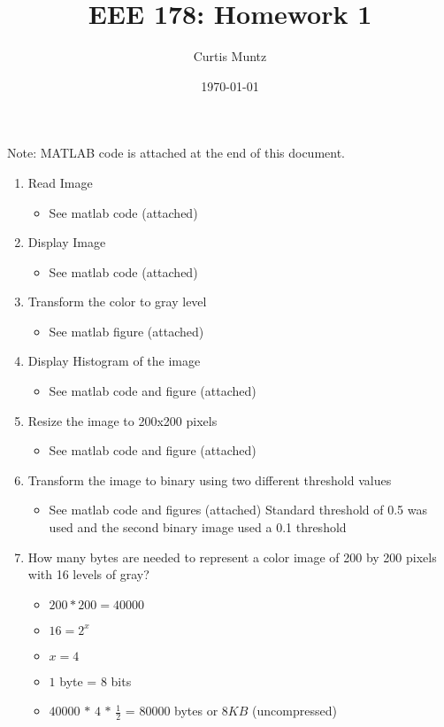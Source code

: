 \documentclass{article}
\title{EEE 178: Homework 1}
\date{\today}
\author{Curtis Muntz}
\begin{document}
\maketitle
Note: MATLAB code is attached at the end of this document.
\begin{enumerate}
  \item Read Image
    \begin{itemize}
      \item See matlab code (attached)
    \end{itemize}
  \item Display Image
    \begin{itemize}
       \item See matlab code (attached)
    \end{itemize}

  \item Transform the color to gray level
    \begin{itemize}
    \item See matlab figure (attached)
    \end{itemize}

  \item Display Histogram of the image
    \begin{itemize}
      \item See matlab code and figure (attached)
    \end{itemize}
  \item Resize the image to 200x200 pixels
    \begin{itemize}
      \item See matlab code and figure (attached)
    \end{itemize}

  \item Transform the image to binary using two different threshold values
    \begin{itemize}
      \item See matlab code and figures (attached) Standard threshold of 0.5 was used and the second binary image used a 0.1 threshold
    \end{itemize}

  \item How many bytes are needed to represent a color image of 200 by 200 pixels with 16 levels of gray?
  \begin{itemize}
    \item $200*200 = 40000$
    \item $16=2^x$
    \item $x = 4$
    \item $1$ byte = $8$ bits
    \item $40000$ $*$ $4$ $*$ $\frac{1}{2}$ = $80000$ bytes or $8KB$ (uncompressed)
  \end{itemize}


\end{enumerate}
\end{document}
